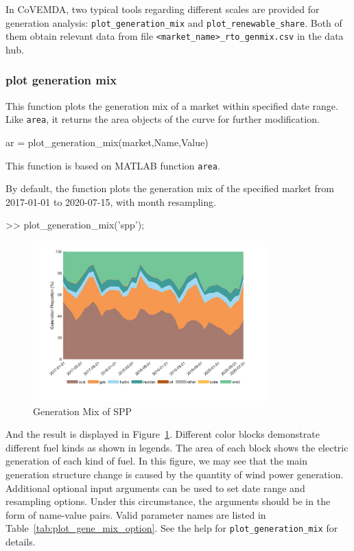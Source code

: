 \documentclass[11pt]{article}
\newcommand{\covemda}{CoVEMDA}
\newcommand{\matlab}{\textsc{MATLAB}}
\numberwithin{equation}{section}
\numberwithin{table}{section}
\numberwithin{figure}{section}
\begin{document}
In \covemda{}, two typical tools regarding different scales are provided for generation analysis: \verb!plot_generation_mix! and \verb!plot_renewable_share!. Both of them obtain relevant data from file \verb!<market_name>_rto_genmix.csv! in the data hub.


\subsubsection{plot generation mix}

This function plots the generation mix of a market within specified date range. Like \verb!area!, it returns the area objects of the curve for further modification.

\begin{Code}
  ar = plot_generation_mix(market,Name,Value)
\end{Code}

This function is based on \matlab{} function \verb!area!.

By default, the function plots the generation mix of the specified market from 2017-01-01 to 2020-07-15, with month resampling.

\begin{Code}
  >> plot_generation_mix('spp');
\end{Code}

\begin{figure}
  \centering
  \noindent\includegraphics[width=0.8\textwidth]{figures/plot_generation_mix_example1.jpg}
  \caption{Generation Mix of SPP} \label{fig:vis_1}
\end{figure}

And the result is displayed in Figure~\ref{fig:vis_1}. Different color blocks demonstrate different fuel kinds as shown in legends. The area of each block shows the electric generation of each kind of fuel. In this figure, we may see that the main generation structure change is caused by the quantity of wind power generation.
 Additional optional input arguments can be used to set date range and resampling options. Under this circumstance, the arguments should be in the form of name-value pairs. Valid parameter names are listed in Table~\ref{tab:plot_gene_mix_option}. See the help for \verb!plot_generation_mix! for details.
 \newpage
\end{document}
